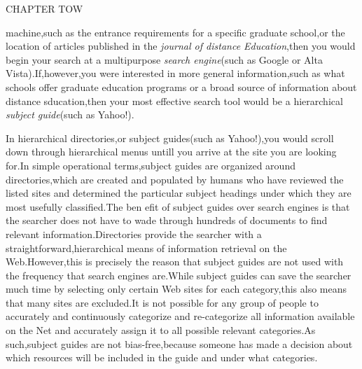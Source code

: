 \documentclass[10pt,a4paper]{book}
\begin{document}
\begin{flushleft}
  \textbf{\!\!\!\!\!\!\!\!\!\!\!\!\!\!\!\!\!\!\!} \qquad CHAPTER TOW
\end{flushleft}

\!\!\!\!\!\!\!\!\!\!machine,such as the entrance requirements for a specific graduate school,or the location of articles published in the \emph{journal of distance Education},then you would begin your search at a multipurpose \emph{search engine}(such as Google or Alta Vista).If,however,you were interested in more general information,such as what schools offer graduate education programs or a broad source of information about distance sducation,then your most effective search tool would be a hierarchical \emph{subject guide}(such as Yahoo!).

In hierarchical directories,or subject guides(such as Yahoo!),you would scroll down through hierarchical menus untill you arrive at the site you are looking for.In simple operational terms,subject guides are organized around directories,which are created and populated by humans who have reviewed the listed sites and determined the particular subject headings under which they are most usefully classified.The ben efit of subject guides over search engines is that the searcher does not have to wade through hundreds of documents to find relevant information.Directories provide the searcher with a straightforward,hierarchical means of information retrieval on the Web.However,this is precisely the reason that subject guides are not used with the frequency that search engines are.While subject guides can save the searcher much time by selecting only certain Web sites for each category,this also means that many sites are excluded.It is not possible for any group of people to accurately and continuously categorize and re-categorize all information available on the Net and accurately assign it to all possible relevant categories.As such,subject guides are not bias-free,because someone has made a decision about which resources will be included in the guide and under what categories.
\end{document}
